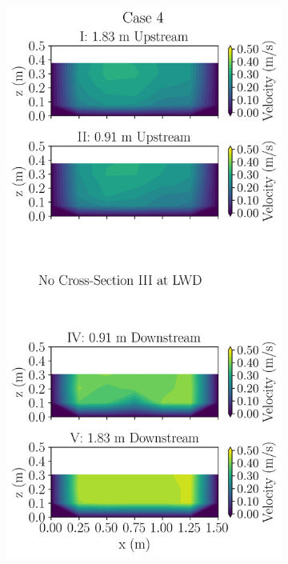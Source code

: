 \documentclass[preview, border=2pt]{standalone}
\begin{document}
\begin{figure}
     \centering
     \begin{subfigure}[b]{0.24\textwidth}
         \centering         
         \caption{}
         \includegraphics[width=\textwidth]{Case4_velocity_contours.png}         

\end{subfigure}
\end{figure}
\end{document}
